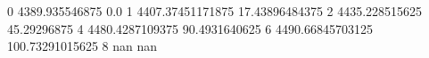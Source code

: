 0 4389.935546875 0.0
1 4407.37451171875 17.43896484375
2 4435.228515625 45.29296875
4 4480.4287109375 90.4931640625
6 4490.66845703125 100.73291015625
8 nan nan
